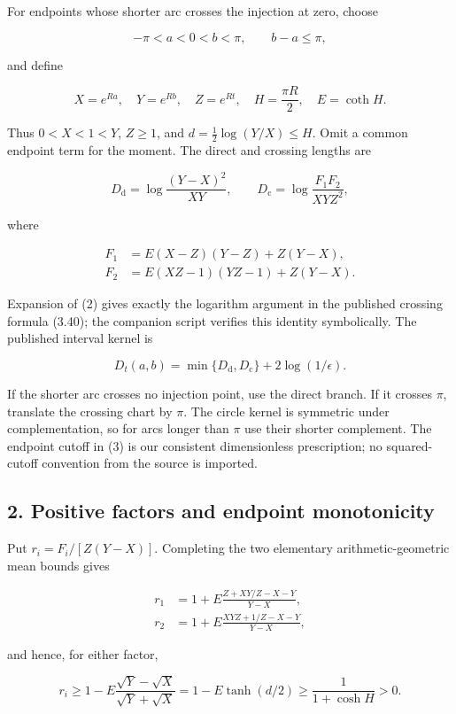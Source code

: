 \documentclass[11pt]{article}
\begin{document}
For endpoints whose shorter arc crosses the injection at zero, choose

\[
-\pi<a<0<b<\pi,\qquad b-a\le\pi,
\]

and define

\[
X=e^{Ra},\quad Y=e^{Rb},\quad Z=e^{Rt},\quad
H=\frac{\pi R}{2},\quad E=\coth H.
\]

Thus \(0<X<1<Y\), \(Z\ge1\), and \(d=\tfrac12\log(Y/X)\le H\). Omit a
common endpoint term for the moment. The direct and crossing lengths are

\[
D_{\mathrm d}=\log\frac{(Y-X)^2}{XY},
\qquad
D_{\mathrm c}=\log\frac{F_1F_2}{XYZ^2},
\tag{1}
\]

where

\[
\begin{aligned}
F_1&=E(X-Z)(Y-Z)+Z(Y-X),\\
F_2&=E(XZ-1)(YZ-1)+Z(Y-X).
\end{aligned}
\tag{2}
\]

Expansion of (2) gives exactly the logarithm argument in the published
crossing formula (3.40); the companion script verifies this identity
symbolically. The published interval kernel is

\[
D_t(a,b)=\min\{D_{\mathrm d},D_{\mathrm c}\}
 +2\log(1/\epsilon).
\tag{3}
\]

If the shorter arc crosses no injection point, use the direct branch. If
it crosses \(\pi\), translate the crossing chart by \(\pi\). The circle
kernel is symmetric under complementation, so for arcs longer than
\(\pi\) use their shorter complement. The endpoint cutoff in (3) is our
consistent dimensionless prescription; no squared-cutoff convention from
the source is imported.

\subsection{2. Positive factors and endpoint
monotonicity}\label{positive-factors-and-endpoint-monotonicity}

Put \(r_i=F_i/[Z(Y-X)]\). Completing the two elementary
arithmetic-geometric mean bounds gives

\[
\begin{aligned}
r_1&=1+E\frac{Z+XY/Z-X-Y}{Y-X},\\
r_2&=1+E\frac{XYZ+1/Z-X-Y}{Y-X},
\end{aligned}
\]

and hence, for either factor,

\[
r_i\ge1-E\frac{\sqrt Y-\sqrt X}{\sqrt Y+\sqrt X}
 =1-E\tanh(d/2)
 \ge\frac1{1+\cosh H}>0.
\tag{4}
\]
\end{document}
